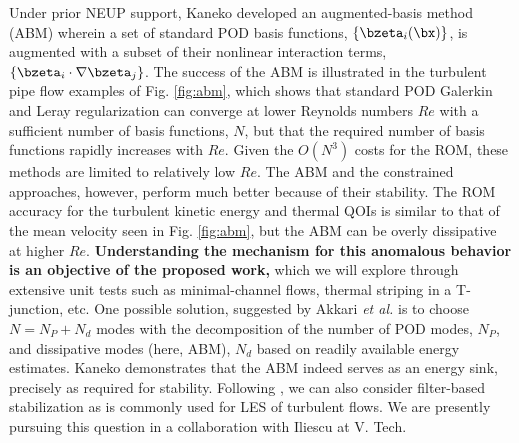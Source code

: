    Under prior NEUP support, Kaneko \cite{kaneko22a,kaneko22} developed an
augmented-basis method (ABM) wherein a set of standard POD basis functions,
$\{\bzeta_i(\bx) \}$,  is augmented with a subset of their nonlinear
interaction terms, $\{\bzeta_i \cdot \nabla \bzeta_j\}$.  The success of the
ABM is illustrated in the turbulent pipe flow examples of Fig. \ref{fig:abm},
which shows that standard POD Galerkin and Leray regularization can converge at
lower Reynolds numbers $Re$ with a sufficient number of basis functions, $N$,
but that the required number of basis functions rapidly increases with $Re$.
Given the $O(N^3)$ costs for the ROM, these methods are limited to relatively
low $Re$.  The ABM and the constrained approaches, however, perform much better
because of their stability.  The ROM accuracy for the turbulent kinetic energy 
and thermal QOIs is similar to that of the  mean velocity seen in Fig. \ref{fig:abm},
but the ABM can be overly dissipative at higher $Re$.  \textbf{Understanding the
mechanism for this anomalous behavior is an objective of the proposed work,}
which we will explore through extensive unit tests such as minimal-channel
flows, thermal striping in a T-junction, etc.
  One possible solution, suggested by Akkari {\em et al.} \cite{akkari19} is to
choose $N=N_P + N_d$ modes with the decomposition of the number
of POD modes, $N_P$, and dissipative modes (here, ABM), $N_d$ based on
readily available energy estimates.  
Kaneko \cite{kaneko22a,kaneko22} demonstrates that the ABM indeed serves as an
energy sink, precisely as required for stability.
  Following \cite{wang2012proper,mou2021}, we can also consider filter-based
stabilization as is commonly used for LES of turbulent flows.  We are 
presently pursuing this question in a collaboration with Iliescu at V. Tech.

